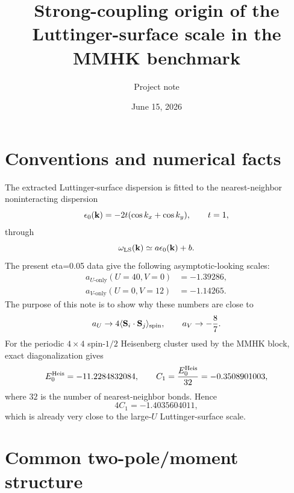 \documentclass[11pt]{article}
\title{Strong-coupling origin of the Luttinger-surface scale in the MMHK benchmark}
\author{Project note}
\date{June 15, 2026}
\newcommand{\eps}{\epsilon_0({\bf k})}
\newcommand{\wls}{\omega_{\rm LS}({\bf k})}
\newcommand{\Cnn}{C_1}
\begin{document}
\maketitle

\section{Conventions and numerical facts}

The extracted Luttinger-surface dispersion is fitted to the nearest-neighbor noninteracting dispersion
\begin{equation}
\eps=-2t(\cos k_x+\cos k_y),\qquad t=1,
\end{equation}
through
\begin{equation}
\wls\simeq a\eps+b .
\end{equation}
The present eta=0.05 data give the following asymptotic-looking scales:
\begin{align}
  a_{U\text{-only}}(U=40,V=0)&=-1.39286,\\
  a_{V\text{-only}}(U=0,V=12)&=-1.14265.
\end{align}
The purpose of this note is to show why these numbers are close to
\begin{equation}
  a_U\to 4\langle{\bf S}_i\cdot{\bf S}_j\rangle_{\rm spin},
  \qquad
  a_V\to -\frac87 .
\end{equation}
For the periodic $4\times4$ spin-$1/2$ Heisenberg cluster used by the MMHK block,
exact diagonalization gives
\begin{equation}
  E_0^{\rm Heis}=-11.2284832084,
  \qquad
  \Cnn=\frac{E_0^{\rm Heis}}{32}=-0.3508901003,
\end{equation}
where $32$ is the number of nearest-neighbor bonds.  Hence
\begin{equation}
  4\Cnn=-1.4035604011,
\end{equation}
which is already very close to the large-$U$ Luttinger-surface scale.

\section{Common two-pole/moment structure}
\end{document}

